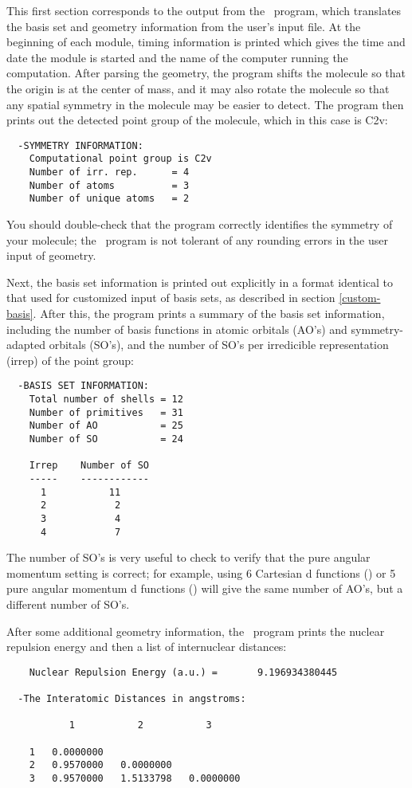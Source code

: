 This first section corresponds to the output from the \PSIinput\ program,
which translates the basis set and geometry information from the user's
input file.  At the beginning of each module, timing information is
printed which gives the time and date the module is started and the name
of the computer running the computation.  After parsing the geometry, the
program shifts the molecule so that the origin is at the center of mass,
and it may also rotate the molecule so that any spatial symmetry in the 
molecule may be easier to detect.  The program then prints out the 
detected point group of the molecule, which in this case is C2v:
\begin{verbatim}
  -SYMMETRY INFORMATION:
    Computational point group is C2v
    Number of irr. rep.      = 4
    Number of atoms          = 3
    Number of unique atoms   = 2
\end{verbatim}
You should double-check that the program correctly identifies the symmetry
of your molecule; the \PSIthree\ program is not tolerant of any rounding 
errors in the user input of geometry.

Next, the basis set information is printed out explicitly in a format
identical to that used for customized input of basis sets, as described
in section \ref{custom-basis}.  After this, the program prints a summary
of the basis set information, including the number of basis functions
in atomic orbitals (AO's) and symmetry-adapted orbitals (SO's), and
the number of SO's per irredicible representation (irrep) of the point group:
\begin{verbatim}
  -BASIS SET INFORMATION:
    Total number of shells = 12
    Number of primitives   = 31
    Number of AO           = 25
    Number of SO           = 24
                                                                                
    Irrep    Number of SO
    -----    ------------
      1           11
      2            2
      3            4
      4            7
\end{verbatim}
The number of SO's is very useful to check to verify that the pure
angular momentum setting is correct; for example, using 
6 Cartesian d functions () or 5 pure 
angular momentum d functions () will 
give the same number of AO's, but a different number of SO's.

After some additional geometry information, the \PSIinput\ program
prints the nuclear repulsion energy and then a list of internuclear
distances:
\begin{verbatim}
    Nuclear Repulsion Energy (a.u.) =       9.196934380445
                                                                                
  -The Interatomic Distances in angstroms:
                                                                                
           1           2           3
                                                                                
    1   0.0000000
    2   0.9570000   0.0000000
    3   0.9570000   1.5133798   0.0000000
\end{verbatim}


